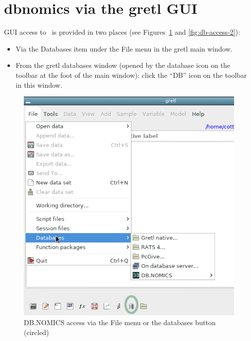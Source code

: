 \documentclass{article}
\begin{document}
\section{dbnomics via the gretl GUI}
\label{sec:dbn-gui}

GUI access to \DB\ is provided in two places (see
Figures~\ref{fig:db-access-1} and \ref{fig:db-access-2}):
\begin{itemize}
\item Via the \textsf{Databases} item under the \textsf{File} menu in
  the gretl main window.
\item From the gretl databases window (opened by the database icon on
  the toolbar at the foot of the main window): click the ``DB'' icon
  on the toolbar in this window.
\end{itemize}

\begin{figure}[htbp]
  \centering
  \includegraphics[scale=2.0]{db-access-1}
  \caption{DB.NOMICS access via the File menu or the databases
    button (circled)}
  \label{fig:db-access-1}
\end{figure}
\end{document}
